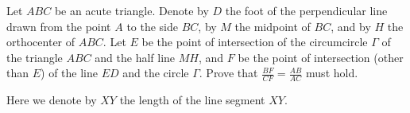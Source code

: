 Let $ ABC $ be an acute triangle. Denote by $ D $ the foot of the perpendicular line drawn from the point $ A $ to the side $ BC $, by $M$ the midpoint of $ BC $, and by $ H $ the orthocenter of $ ABC $. Let $ E $ be the point of intersection of the circumcircle $ \Gamma $ of the triangle $ ABC $ and the half line $ MH $, and $ F $ be the point of intersection (other than  $E$) of the line $ ED $ and the circle $ \Gamma $. Prove that $ \tfrac{BF}{CF} = \tfrac{AB}{AC} $ must hold. 

Here we denote by $XY$ the length of the line segment $XY$.